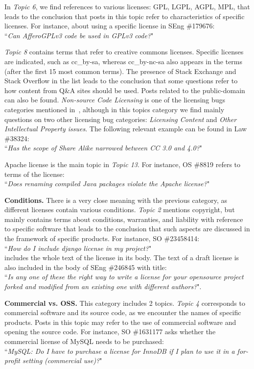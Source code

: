 \documentclass{elsarticle}
\begin{document}
In \emph{Topic 6}, we find references to various licenses: GPL, LGPL, AGPL, MPL, that leads to the conclusion that posts in this topic refer to characteristics of specific licenses. For instance, about using a specific license in SEng \#179676:\\
``\emph{Can AfferoGPLv3 code be used in GPLv3 code?}"

\emph{Topic 8} contains terms that refer to creative commons licenses. Specific licenses are indicated, such as cc\_by-sa, whereas cc\_by-nc-sa also appears in the terms (after the first 15 most common terms). The presence of Stack Exchange and Stack Overflow in the list leads to the conclusion that some questions refer to how content from Q\&A sites should be used. Posts related to the public-domain can also be found. \emph{Non-source Code Licensing} is one of the licensing bugs categories mentioned in~\cite{vendome2018distribute}, although in this topics category we find mainly questions on two other licensing bug categories: \emph{Licensing Content} and \emph{Other Intellectual Property issues}. The following relevant example can be found in Law \#38324:\\
``\emph{Has the scope of Share Alike narrowed between CC 3.0 and 4.0?}"

Apache license is the main topic in \emph{Topic 13}. For instance, OS \#8819 refers to terms of the license:\\
``\emph{Does renaming compiled Java packages violate the Apache license?}"

\textbf{Conditions.} There is a very close meaning with the previous category, as different licenses contain various conditions. \emph{Topic 2} mentions copyright, but mainly contains terms about conditions, warranties, and liability with reference to specific software that leads to the conclusion that such aspects are discussed in the framework of specific products. For instance, SO \#23458414:\\
``\emph{How do I include django license in my project?}"\\
includes the whole text of the license in its body. The text of a draft license is also included in the body of SEng \#246845 with title:\\
``\emph{Is any one of these the right way to write a license for your opensource project forked and modified from an existing one with different authors?}".

\textbf{Commercial vs. OSS.} This category includes 2 topics. \emph{Topic 4} corresponds to commercial software and its source code, as we encounter the names of specific products. Posts in this topic may refer to the use of commercial software and opening the source code. For instance, SO \#1631177 asks whether the commercial license of MySQL needs to be purchased:\\
``\emph{MySQL: Do I have to purchase a license for InnoDB if I plan to use it in a for-profit setting (commercial use)?}"
\end{document}
